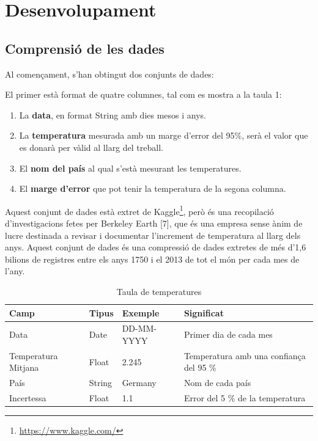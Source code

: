 \documentclass[10pt,a4paper,twocolumn,twoside]{article}
\begin{document}
\section {Desenvolupament}
\subsection{Comprensió de les dades}
Al començament, s'han obtingut dos conjunts de dades:

El primer està format de quatre columnes, tal com es mostra a la taula 1:
\begin{enumerate}
\item La \textbf{data}, en format String amb dies mesos i anys.
\item La \textbf{temperatura} mesurada amb un marge d'error del 95\%, serà el valor que es donarà per vàlid al llarg del treball. 
\item El \textbf{nom del país} al qual s'està mesurant les temperatures.
\item El \textbf{marge d'error} que pot tenir la temperatura de la segona columna.
\end{enumerate}
Aquest conjunt de dades està extret de Kaggle\footnote{\url{https://www.kaggle.com/}}, però és una recopilació d'investigacions fetes per Berkeley Earth [7], que és una empresa sense ànim de lucre destinada a revisar i documentar l'increment de temperatura al llarg dels anys. Aquest conjunt de dades és una compressió de dades extretes de més d'1,6 bilions de registres entre els anys 1750 i el 2013 de tot el món per cada mes de l'any.

\begin{table}[th]
\caption{Taula de temperatures}
\begin{center}
\begin{tabular}{  m{1.6cm}| m{0.8cm}| m{1.3cm} | m{2.5cm} }
\hline\hline %
\textbf{Camp} & \textbf{Tipus} & \textbf{Exemple} & \textbf{Significat} \\
\hline
Data & Date & DD-MM-YYYY & Primer dia de cada mes \\
\hline
Temperatura Mitjana & Float & 2.245 & Temperatura amb una confiança del 95 \%  \\
\hline
País & String & Germany & Nom de cada país \\
\hline
Incertessa & Float & 1.1 & Error del 5 \% de la temperatura\\
\hline
\hline
\end{tabular}
\end{center}
\end{table}
\end{document}
